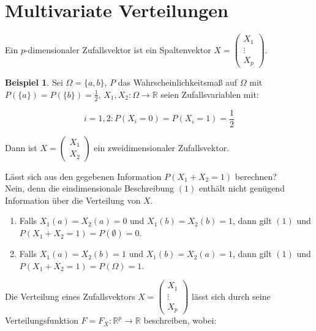 \documentclass[12pt, a4paper]{article}
\title{\doctitle}
\author{\authors}
\date{\today}
\newcommand{\expage}{} %
\theoremstyle{plain}
\theoremstyle{definition}
\newtheorem{beispiel}[thm]{Beispiel}
\newcommand{\1}{\mathds{1}}
\begin{document}
\section{Multivariate Verteilungen}


Ein $p$-dimensionaler Zufallsvektor ist ein Spaltenvektor
\(X=\begin{pmatrix}X_1\\\vdots\\X_p\end{pmatrix}\).\\
\begin{beispiel}
   Sei $\Omega=\{a,b\}$, $P$ das Wahrscheinlichkeitsmaß auf $\Omega$ mit $P(\{a\})=P(\{b\})=\frac{1}{2}$, $X_1,X_2:\Omega\rightarrow\mathbb{R}$ seien Zufallsvariablen mit:

\[   i=1,2:P(X_i=0)=P(X_i=1)=\frac{1}{2}\] 
      \end{beispiel}

     Dann ist $X=\begin{pmatrix}X_1\\X_2\end{pmatrix}$ ein zweidimensionaler Zufallsvektor. 

     Lässt sich aus den gegebenen Information \(P(X_1+X_2=1)\) berechnen?\\

   Nein, denn die eindimensionale Beschreibung \((1)\) enthält nicht genügend Information über die Verteilung von \(X\).
      \begin{enumerate}
      \item Falls \(X_1(a)=X_2(a)=0\) und \(X_1(b)=X_2(b)=1\), dann gilt \((1)\) und \(P(X_1+X_2=1)=P(\emptyset)=0\).
      \item Falls \(X_1(a)=X_2(b)=1\) und \(X_1(b)=X_2(a)=1\), dann gilt \((1)\) und \(P(X_1+X_2=1)=P(\Omega)=1\).
      \end{enumerate}

Die Verteilung eines Zufallsvektors \(X=\begin{pmatrix}X_1\\\vdots\\X_p\end{pmatrix}\) lässt sich durch seine Verteilungsfunktion \(F=F_X:\mathbb{R}^p\rightarrow\mathbb{R}\) beschreiben, wobei:
\end{document}
